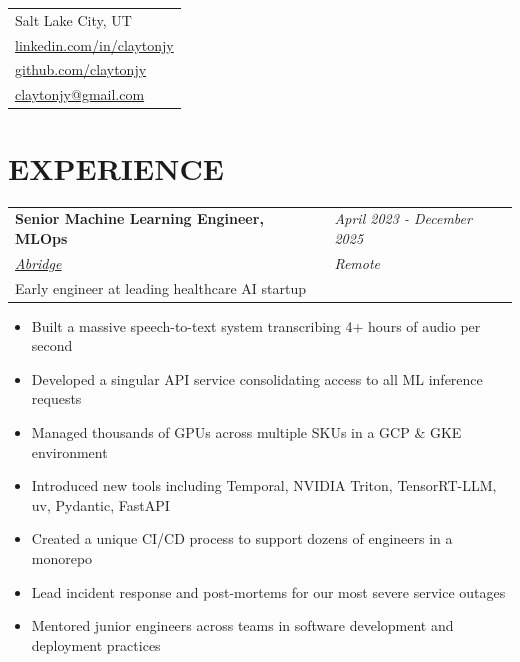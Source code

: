 \documentclass[margin,line]{res}
\begin{document}


\begin{resume}

  \vspace{-.15in}
  \hfill
  \begin{tabular}{l}
    Salt Lake City, UT                                                     \\
    \href{http://www.linkedin.com/in/claytonjy}{linkedin.com/in/claytonjy} \\
    \href{https://github.com/claytonjy}{github.com/claytonjy}              \\
    \href{mailto:claytonjy@gmail.com}{claytonjy@gmail.com}                 \\
  \end{tabular}
  
  
  \section{EXPERIENCE}

  \begin{tabular}{p{4.6in} l}
    {\bf Senior Machine Learning Engineer, MLOps} & \emph{April 2023 - December 2025} \\
    \href{https://www.abridge.com/}{\it Abridge}        & \emph{Remote}               \\
    Early engineer at leading healthcare AI startup
  \end{tabular}
  \vspace{2pt}
  \begin{itemize}\itemsep -2pt
    \item Built a massive speech-to-text system transcribing 4+ hours of audio per second
    \item Developed a singular API service consolidating access to all ML inference requests
    \item Managed thousands of GPUs across multiple SKUs in a GCP \& GKE environment
    \item Introduced new tools including Temporal, NVIDIA Triton, TensorRT-LLM, uv, Pydantic, FastAPI
    \item Created a unique CI/CD process to support dozens of engineers in a monorepo
    \item Lead incident response and post-mortems for our most severe service outages
    \item Mentored junior engineers across teams in software development and deployment practices
  \end{itemize}
  

\end{resume}
\end{document}
